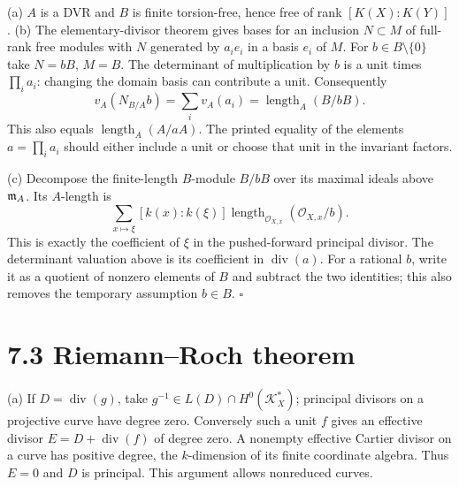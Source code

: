 \documentclass[11pt]{article}
\let\chapterexercise\exercise
\renewcommand{\exercise}[2]{\Needspace{8\baselineskip}\chapterexercise{#1}{#2}}
\begin{document}
\pf
(a) $A$ is a DVR and $B$ is finite torsion-free, hence free of rank $[K(X):K(Y)]$. (b) The elementary-divisor theorem gives bases for an inclusion $N\subset M$ of full-rank free modules with $N$ generated by $a_ie_i$ in a basis $e_i$ of $M$. For $b\in B\setminus\{0\}$ take $N=bB$, $M=B$. The determinant of multiplication by $b$ is a unit times $\prod_i a_i$: changing the domain basis can contribute a unit. Consequently
\[ v_A(N_{B/A}b)=\sum_i v_A(a_i)=\operatorname{length}_A(B/bB). \]
This also equals $\operatorname{length}_A(A/aA)$. The printed equality of the elements $a=\prod_i a_i$ should either include a unit or choose that unit in the invariant factors.

(c) Decompose the finite-length $B$-module $B/bB$ over its maximal ideals above $\mathfrak m_A$. Its $A$-length is
\[ \sum_{x\mapsto\xi}[k(x):k(\xi)]\operatorname{length}_{\mathcal O_{X,x}}(\mathcal O_{X,x}/b). \]
This is exactly the coefficient of $\xi$ in the pushed-forward principal divisor. The determinant valuation above is its coefficient in $\operatorname{div}(a)$. For a rational $b$, write it as a quotient of nonzero elements of $B$ and subtract the two identities; this also removes the temporary assumption $b\in B$. \hfill$\square$

\section*{7.3 Riemann--Roch theorem}

\pf
(a) If $D=\operatorname{div}(g)$, take $g^{-1}\in L(D)\cap H^0(\mathcal K_X^*)$; principal divisors on a projective curve have degree zero. Conversely such a unit $f$ gives an effective divisor $E=D+\operatorname{div}(f)$ of degree zero. A nonempty effective Cartier divisor on a curve has positive degree, the $k$-dimension of its finite coordinate algebra. Thus $E=0$ and $D$ is principal. This argument allows nonreduced curves.
\end{document}
